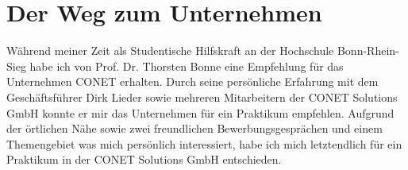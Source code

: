 \section{Der Weg zum Unternehmen}
Während meiner Zeit als Studentische Hilfskraft an der Hochschule Bonn-Rhein-Sieg habe ich von Prof. Dr. Thorsten Bonne eine Empfehlung für das Unternehmen CONET erhalten. Durch seine persönliche Erfahrung mit dem Geschäftsführer Dirk Lieder sowie mehreren Mitarbeitern der CONET Solutions GmbH konnte er mir das Unternehmen für ein Praktikum empfehlen. Aufgrund der örtlichen Nähe sowie zwei freundlichen Bewerbungsgesprächen und einem Themengebiet was mich persönlich interessiert, habe ich mich letztendlich für ein Praktikum in der CONET Solutions GmbH entschieden.